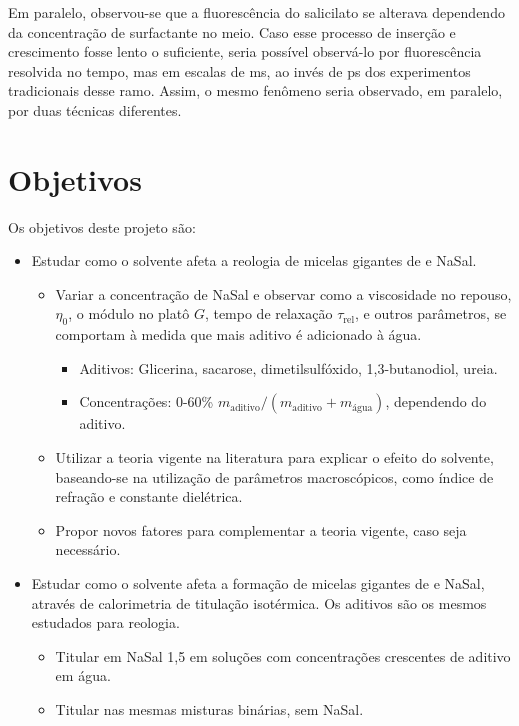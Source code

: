 		Em paralelo, observou-se que a fluorescência do salicilato se alterava dependendo da concentração de surfactante no meio. Caso esse processo de inserção e crescimento fosse lento o suficiente, seria possível observá-lo por fluorescência resolvida no tempo, mas em escalas de ms, ao invés de ps dos experimentos tradicionais desse ramo. Assim, o mesmo fenômeno seria observado, em paralelo, por duas técnicas diferentes.
			
	\chapter{Objetivos}
		Os objetivos deste projeto são:
		
		\begin{itemize}[noitemsep]
			\item Estudar como o solvente afeta a reologia de micelas gigantes de \CTAB{} e NaSal.
			\begin{itemize}[noitemsep]
				\item Variar a concentração de NaSal e observar como a viscosidade no repouso, \(\eta_0\), o módulo no platô \(G\), tempo de relaxação \(\tau_{\mathrm{rel}}\), e outros parâmetros, se comportam à medida que mais aditivo é adicionado à água.
				\begin{itemize}[noitemsep]
					\item Aditivos: Glicerina, sacarose, dimetilsulfóxido, 1,3-butanodiol, ureia.
					\item Concentrações: 0-60\% \(m_{\mathrm{aditivo}}/\left(m_{\mathrm{aditivo}}+m_{\mathrm{água}}\right)\), dependendo do aditivo.
				\end{itemize}
				\item Utilizar a teoria vigente na literatura para explicar o efeito do solvente, baseando-se na utilização de parâmetros macroscópicos, como índice de refração e constante dielétrica.
				\item Propor novos fatores para complementar a teoria vigente, caso seja necessário.
			\end{itemize}
			\item Estudar como o solvente afeta a formação de micelas gigantes de \TTAB{} e NaSal, através de calorimetria de titulação isotérmica. Os aditivos são os mesmos estudados para reologia.
			\begin{itemize}[noitemsep]
				\item Titular \TTAB{} em NaSal 1,5\mM{} em soluções com concentrações crescentes de aditivo em água.
				\item Titular \TTAB{} nas mesmas misturas binárias, sem NaSal.

\end{itemize}
\end{itemize}
